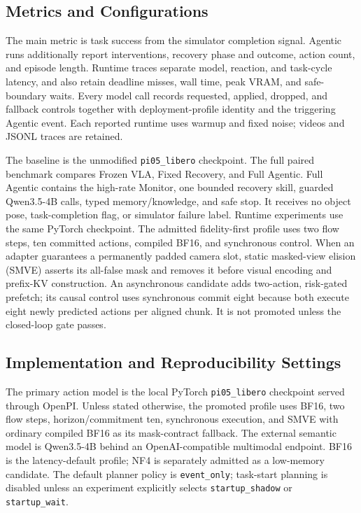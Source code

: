 \documentclass[runningheads]{waica}
\begin{document}
\subsection{Metrics and Configurations}

The main metric is task success from the simulator completion signal. Agentic
runs additionally report interventions, recovery phase and outcome, action
count, and episode length. Runtime traces separate model, reaction, and
task-cycle latency, and also retain deadline misses, wall time, peak VRAM, and
safe-boundary waits. Every model call records requested, applied, dropped, and
fallback controls together with deployment-profile identity and the triggering
Agentic event. Each reported runtime uses warmup and fixed noise; videos and
JSONL traces are retained.

The baseline is the unmodified \texttt{pi05\_libero} checkpoint. The full
paired benchmark compares Frozen VLA, Fixed Recovery, and Full Agentic. Full
Agentic contains the high-rate Monitor, one bounded recovery skill, guarded
Qwen3.5-4B calls, typed memory/knowledge, and safe stop. It receives no object
pose, task-completion flag, or simulator failure label. Runtime experiments use
the same PyTorch checkpoint. The admitted fidelity-first profile uses two flow
steps, ten committed actions, compiled BF16, and synchronous control.
When an adapter guarantees a permanently padded camera slot, static masked-view
elision (SMVE) asserts its all-false mask and removes it before visual encoding
and prefix-KV construction.
An asynchronous candidate adds two-action, risk-gated prefetch; its causal
control uses synchronous commit eight because both execute eight newly
predicted actions per aligned chunk. It is not promoted unless the closed-loop
gate passes.

\subsection{Implementation and Reproducibility Settings}

The primary action model is the local PyTorch
\texttt{pi05\_libero} checkpoint served through OpenPI. Unless stated
otherwise, the promoted profile uses BF16, two flow steps, horizon/commitment
ten, synchronous execution, and SMVE with ordinary compiled BF16 as its
mask-contract fallback. The external semantic model is Qwen3.5-4B behind an
OpenAI-compatible multimodal endpoint. BF16 is the latency-default profile;
NF4 is separately admitted as a low-memory candidate. The default planner policy is
\texttt{event\_only}; task-start planning is disabled unless an experiment
explicitly selects \texttt{startup\_shadow} or \texttt{startup\_wait}.
\end{document}
